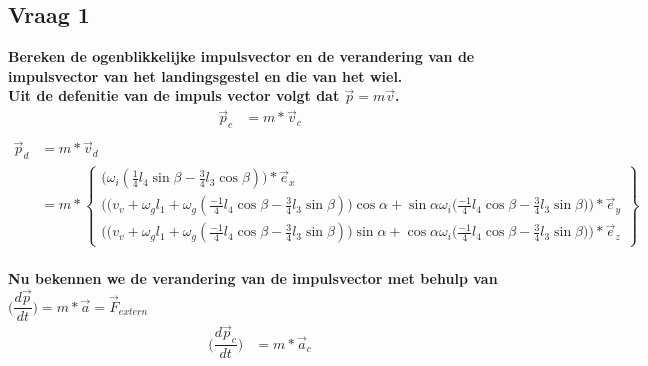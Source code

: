 \documentclass[a4paper,10pt]{article}
\begin{document}
\subsection{Vraag 1}
\textbf{Bereken de ogenblikkelijke impulsvector en de verandering van de impulsvector van het landingsgestel en die van het wiel.}\\
\textbf{Uit de defenitie van de impuls vector volgt dat $\vec{p} = m \vec{v}$.}
\begin{equation}
\begin{aligned}
	\vec{p}_c &= m *\vec{v}_c \\
\end{aligned}
\end{equation}
\begin{equation}
\begin{aligned}
\vec{p}_d &= m *\vec{v}_d \\
&= m * \begin{Bmatrix}
\Big(\omega_i  (\frac{1}{4}l_4 \sin{\beta}-\frac{3}{4}l_3  \cos{\beta})\Big) * \vec{e}_{x}\\
\Big(\big(v_v + \omega_g  l_1 + \omega_g(\frac{-1}{4} l_4 \cos{\beta}-\frac{3}{4} l_3 \sin{\beta}) \big) \cos{\alpha}  + \sin{\alpha}  \omega_i  \big( \frac{-1}{4}l_4 \cos{\beta} - \frac{3}{4}l_3 \sin{\beta}\big)\Big)*\vec{e}_{y} \\
\Big(\big(v_v + \omega_g   l_1 + \omega_g (\frac{-1}{4} l_4 \cos{\beta}-\frac{3}{4} l_3 \sin{\beta}) \big) \sin{\alpha}  + \cos{\alpha}  \omega_i   \big( \frac{-1}{4} l_4 \cos{\beta} - \frac{3}{4}l_3 \sin{\beta}\big)\Big)*\vec{e}_{z}
\end{Bmatrix}
\end{aligned}
\end{equation}\\
\textbf{Nu bekennen we de verandering van de impulsvector met behulp van\\ $\big(\dfrac{d\vec{p}}{dt}\big) = m *\vec{a}=\vec{F}_{extern}$}
\begin{equation}
\begin{aligned}
	\big(\dfrac{d\vec{p}_c}{dt}\big) &= m *\vec{a}_c\\
\end{aligned}
\end{equation}
\end{document}
